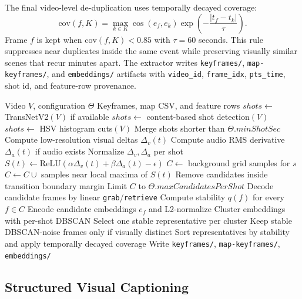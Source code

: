 \documentclass[conference]{IEEEtran}
\newcommand{\vid}{\texttt{video\_id}}
\newcommand{\fid}{\texttt{frame\_idx}}
\newcommand{\ptstime}{\texttt{pts\_time}}
\begin{document}
The final video-level de-duplication uses temporally decayed coverage:
\begin{equation}
\mathrm{cov}(f,K)=\max_{k\in K}
\cos(e_f,e_k)\exp\left(-\frac{|t_f-t_k|}{\tau}\right).
\label{eq:coverage}
\end{equation}
Frame $f$ is kept when $\mathrm{cov}(f,K)<0.85$ with $\tau=60$ seconds. This
rule suppresses near duplicates inside the same event while preserving visually
similar scenes that recur minutes apart. The extractor writes
\texttt{keyframes/}, \texttt{map-keyframes/}, and \texttt{embeddings/} artifacts
with \vid{}, \fid{}, \ptstime{}, shot id, and feature-row provenance.

\begin{algorithm}[!t]
\caption{Adaptive representative keyframe extraction}
\label{alg:keyframe-extract}
\footnotesize
\begin{algorithmic}[1]
\Require Video $V$, configuration $\Theta$
\Ensure Keyframes, map CSV, and feature rows
\State $shots \gets$ TransNetV2$(V)$ if available
  \State $shots \gets$ content-based shot detection$(V)$
\EndIf
{}
  \State $shots \gets$ HSV histogram cuts$(V)$
\EndIf
\State Merge shots shorter than $\Theta.minShotSec$
  \State Compute low-resolution visual deltas $\Delta_v(t)$
  \State Compute audio RMS derivative $\Delta_a(t)$ if audio exists
  \State Normalize $\Delta_v,\Delta_a$ per shot
  \State $S(t) \gets \mathrm{ReLU}(\alpha\Delta_v(t)+\beta\Delta_a(t)-\epsilon)$
  \State $C \gets$ background grid samples for $s$
  \State $C \gets C \cup$ samples near local maxima of $S(t)$
  \State Remove candidates inside transition boundary margin
  \State Limit $C$ to $\Theta.maxCandidatesPerShot$
  \State Decode candidate frames by linear \texttt{grab}/\texttt{retrieve}
  \State Compute stability $q(f)$ for every $f\in C$
  \State Encode candidate embeddings $e_f$ and L2-normalize
  \State Cluster embeddings with per-shot DBSCAN
  \State Select one stable representative per cluster
  \State Keep stable DBSCAN-noise frames only if visually distinct
\EndFor
\State Sort representatives by stability and apply temporally decayed coverage
\State Write \texttt{keyframes/}, \texttt{map-keyframes/}, \texttt{embeddings/}
\end{algorithmic}
\end{algorithm}

\subsection{Structured Visual Captioning}
\end{document}
